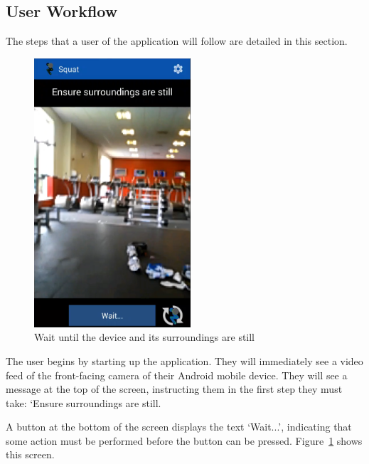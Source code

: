 \subsection{User Workflow}

The steps that a user of the application will follow are detailed in this section.

\begin{figure}[H]
    \centering
	\includegraphics[height=10cm]{application/images/ensuresurroundingsstill}
\caption{Wait until the device and its surroundings are still}
\label{fig:ensuresurroundings}
\end{figure}

The user begins by starting up the application. They will immediately see a video feed of the front-facing camera of their Android mobile device. They will see a message at the top of the screen, instructing them in the first step they must take: `Ensure surroundings are still.

A button at the bottom of the screen displays the text `Wait...', indicating that some action must be performed before the button can be pressed. Figure~\ref{fig:ensuresurroundings} shows this screen.

